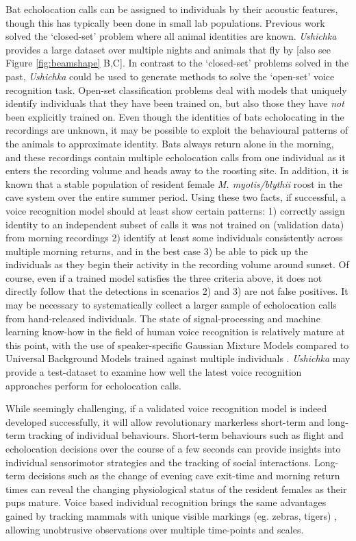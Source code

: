 \documentclass[
]{book}
\begin{document}
Bat echolocation calls can be assigned to individuals by their acoustic features, though this has typically been done in small lab populations. Previous work \citep{masters1995sonar, yovel-a} solved the `closed-set' problem where all animal identities are known. \emph{Ushichka} provides a large dataset over multiple nights and animals that fly by {[}also see Figure \ref{fig:beamshape} B,C{]}. In contrast to the `closed-set' problems solved in the past, \emph{Ushichka} could be used to generate methods to solve the `open-set' voice recognition task. Open-set classification problems deal with models that uniquely identify individuals that they have been trained on, but also those they have \emph{not} been explicitly trained on. Even though the identities of bats echolocating in the recordings are unknown, it may be possible to exploit the behavioural patterns of the animals to approximate identity. Bats always return alone in the morning, and these recordings contain multiple echolocation calls from one individual as it enters the recording volume and heads away to the roosting site. In addition, it is known that a stable population of resident female \emph{M. myotis/blythii} roost in the cave system over the entire summer period. Using these two facts, if successful, a voice recognition model should at least show certain patterns: 1) correctly assign identity to an independent subset of calls it was not trained on (validation data) from morning recordings 2) identify at least some individuals consistently across multiple morning returns, and in the best case 3) be able to pick up the individuals as they begin their activity in the recording volume around sunset. Of course, even if a trained model satisfies the three criteria above, it does not directly follow that the detections in scenarios 2) and 3) are not false positives. It may be necessary to systematically collect a larger sample of echolocation calls from hand-released individuals. The state of signal-processing and machine learning know-how in the field of human voice recognition is relatively mature at this point, with the use of speaker-specific Gaussian Mixture Models compared to Universal Background Models trained against multiple individuals \citep{Hennebert2009}. \emph{Ushichka} may provide a test-dataset to examine how well the latest voice recognition approaches perform for echolocation calls.

While seemingly challenging, if a validated voice recognition model is indeed developed successfully, it will allow revolutionary markerless short-term and long-term tracking of individual behaviours. Short-term behaviours such as flight and echolocation decisions over the course of a few seconds can provide insights into individual sensorimotor strategies and the tracking of social interactions. Long-term decisions such as the change of evening cave exit-time and morning return times can reveal the changing physiological status of the resident females as their pups mature. Voice based individual recognition brings the same advantages gained by tracking mammals with unique visible markings (eg. zebras, tigers) \citep{lahiri11_biometric, hiby2009tiger}, allowing unobtrusive observations over multiple time-points and scales.
\end{document}
